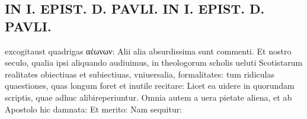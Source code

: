 \documentclass{article}
\begin{document}
\begin{pages}
\section*{IN I. EPIST. D. PAVLI. IN I. EPIST. D. PAVLI. }
\marginpar{[ p.122 ]}\pstart excogitaust quadrigas αἐωνων: Alii alia absurdissima sunt commenti. Et nostro seculo, qualia ipsi aliquando audiuimus, in theologorum scholis ueluti Scotistarum realitates obiectiuas et subiectiuas, vniuersalia, formalitates: tum ridiculas quaestiones, quas longum foret et inutile recitare: Licet ea uidere in quorundam scriptis, quae adhuc alibireperiuntur. Omnia autem a uera pietate aliena, et ab Apostolo hic damnata: Et merito: Nam sequitur:  \pend
{}
{}

\end{pages}
\end{document}
